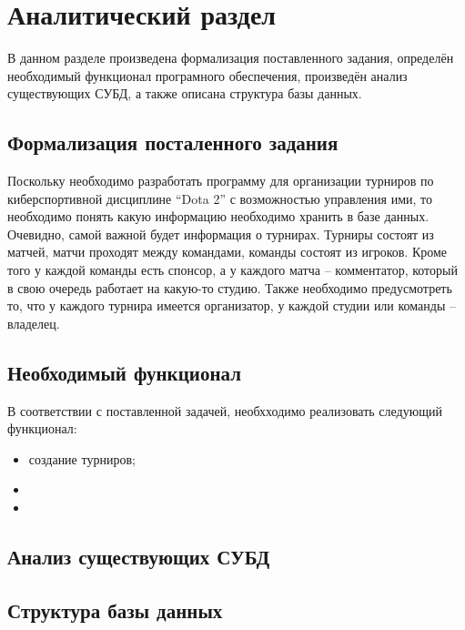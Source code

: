 \chapter{Аналитический раздел}
В данном разделе произведена формализация поставленного задания, определён необходимый функционал програмного обеспечения, произведён анализ существующих СУБД, а также описана структура базы данных.

\section{Формализация посталенного задания}
Поскольку необходимо разработать программу для организации турниров по киберспортивной дисциплине “Dota 2” с возможностью управления ими, то необходимо понять какую информацию необходимо хранить в базе данных. Очевидно, самой важной будет информация о турнирах. Турниры состоят из матчей, матчи проходят между командами, команды состоят из игроков. Кроме того у каждой команды есть спонсор, а у каждого матча -- комментатор, который в свою очередь работает на какую-то студию. Также необходимо предусмотреть то, что у каждого турнира имеется организатор, у каждой студии или команды -- владелец.

\section{Необходимый функционал}
В соответствии с поставленной задачей, необхходимо реализовать следующий функционал:
\begin{itemize}
	\item создание турниров;
	\item
	\item	
\end{itemize}

\section{Анализ существующих СУБД}

\section{Структура базы данных}
